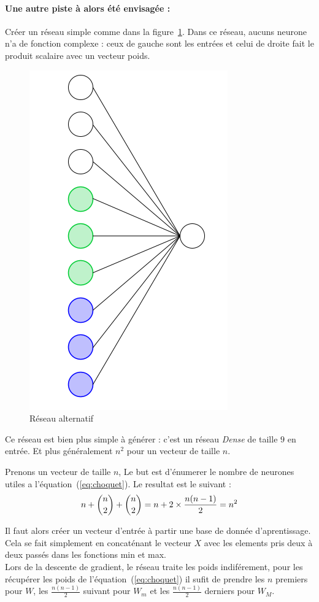 \paragraph{Une autre piste à alors été envisagée :}
Créer un réseau simple comme dans la figure\ \ref{fig:net3}.
Dans ce réseau, aucuns neurone n'a de fonction complexe :
ceux de gauche sont les entrées et
celui de droite fait le produit scalaire avec un vecteur poids.
\begin{figure}[H]
    \center
    \includegraphics[height=\petit]{pict/net3.png}
	\caption{Réseau alternatif}
	\label{fig:net3}
\end{figure}
\vspace{-12pt}
Ce réseau est bien plus simple à générer : c'est un réseau \emph{Dense} de taille $9$ en entrée.
Et plus généralement $n^2$ pour un vecteur de taille $n$.


{
Prenons un vecteur de taille $n$,
Le but est d'énumerer le nombre de neurones utiles a l'équation\ (\ref{eq:choquet}).
Le resultat est le suivant :
\begin{equation}
    n + \dbinom{n}{2} + \dbinom{n}{2} = n + 2 \times \frac{n(n-1)}{2} = n^2
\end{equation}
}

Il faut alors créer un vecteur d'entrée à partir une base de donnée d'aprentissage.
Cela se fait simplement en concaténant le vecteur $X$ avec les elements pris deux à deux passés
dans les fonctions min et max.\\


Lors de la descente de gradient, le réseau traite les poids indiférement,
pour les récupérer les poids de l'équation\ (\ref{eq:choquet})
il sufit de prendre les $n$ premiers pour $W$,
les $\frac{n(n-1)}{2}$ suivant pour $W_m$
et les $\frac{n(n-1)}{2}$ derniers pour $W_M$.
